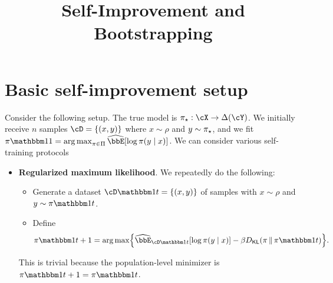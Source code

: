 \documentclass{article}
\title{Self-Improvement and Bootstrapping}
\author{%
%
}
\date{}
\begin{document}
\maketitle

\tableofcontents

\section{Basic self-improvement setup}
Consider the following setup. The true model is $\pistar:\cX\to\Delta(\cY)$. We
initially receive $n$ samples $\cD=\crl*{(x,y)}$ where $x\sim\rho$ and
$y\sim\pi_{\star}$, and we fit $\pi\ind{1}
=\argmax_{\pi\in\Pi}\Eh\brk*{\log\pi(y\mid{}x)}$. We can consider
various self-training protocols
\begin{itemize}
\item \textbf{Regularized maximum likelihood}. We repeatedly do the following:
  \begin{itemize}
  \item Generate a dataset $\cD\ind{t}=\crl*{(x,y)}$ of samples with
    $x\sim\rho$ and $y\sim\pi\ind{t}$.
  \item Define
    \begin{align}
      \label{eq:regularized_mle}
      \pi\ind{t+1}=\argmax\crl*{
      \Eh_{\cD\ind{t}}\brk*{\log\pi(y\mid{}x)}
      -\beta\Dkl{\pi}{\pi\ind{t}}
      }.
    \end{align}
  \end{itemize}
  This is trivial because the population-level minimizer is $\pi\ind{t+1}=\pi\ind{t}$.
  \begin{comment}
    From first-order conditions, the maximizer here should satisfy
    \[
      \frac{\pi\ind{t}(y\mid{}x)}{\pi(y\mid{}x)} =
      \beta\log\frac{\pi(y\mid{}x)}{\pi\ind{t}(y\mid{}x)} + \lambda,
    \]
    where $\lambda\in\bbR$ is a Lagrange multiplier.

    A version that has nicer first-order conditions (not sure if
    there's a closed form yet) is
    \begin{align}
      \label{eq:regularized_mle_chi}
      \pi\ind{t+1}=\argmax\crl*{
      \Eh_{\cD\ind{t}}\brk*{\log\pi(y\mid{}x)}
      -\frac{\beta}{2}\Dchis{\pi}{\pi\ind{t}}
      }.
    \end{align}
    This gives
    $\pi\ind{t}(y\mid{}x)^2 = \beta\pi^2(y\mid{}x) +
    2\lambda\pi(y\mid{}x)\pi\ind{t}(y\mid{}x)$ for a Lagrange
    multiplier $\lambda\in\bbR$. Solving the quadratic equation then
    gives
    $\pi =
    \pi\ind{t}\cdot(\pm\sqrt{\lambda^2+\beta^2}-\lambda)/\beta$, and
    setting $\lambda$ so that this normalizes to $1$ just gives
    $\pi\ind{t+1}=\pi\ind{t}$.


\end{comment}
\end{itemize}
\end{document}

